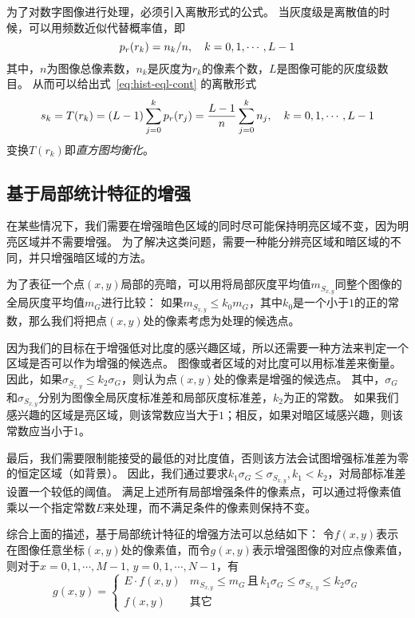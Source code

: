 \documentclass{hitgsrep}
\begin{document}
为了对数字图像进行处理，必须引入离散形式的公式。
当灰度级是离散值的时候，可以用频数近似代替概率值，即
\begin{equation}
    p_r\qty(r_k)=n_k/n\qc{k=0,1,\cdots,L-1}
\end{equation}
其中，$n$为图像总像素数，$n_k$是灰度为$r_k$的像素个数，$L$是图像可能的灰度级数目。
从而可以给出式~\eqref{eq:hist-eql-cont} 的离散形式
\begin{equation}
    s_k=T\qty(r_k)=(L-1)\sum_{j=0}^k p_r(r_j)=\frac{L-1}{n}\sum_{j=0}^k n_j\qc{k=0,1,\cdots,L-1}
\end{equation}
变换$T(r_k)$即\emph{直方图均衡化}。

\subsection{基于局部统计特征的增强}

在某些情况下，我们需要在增强暗色区域的同时尽可能保持明亮区域不变，因为明亮区域并不需要增强。
为了解决这类问题，需要一种能分辨亮区域和暗区域的不同，并只增强暗区域的方法。

为了表征一个点$(x,y)$局部的亮暗，可以用将局部灰度平均值$m_{S_{x,y}}$同整个图像的全局灰度平均值$m_G$进行比较：
如果$m_{S_{x,y}}\le k_0m_G$，其中$k_0$是一个小于$1$的正的常数，那么我们将把点$(x,y)$处的像素考虑为处理的候选点。

因为我们的目标在于增强低对比度的感兴趣区域，所以还需要一种方法来判定一个区域是否可以作为增强的候选点。
图像或者区域的对比度可以用标准差来衡量。
因此，如果$\sigma_{S_{x,y}}\le k_2\sigma_G$，则认为点$(x,y)$处的像素是增强的候选点。
其中，$\sigma_G$和$\sigma_{S_{x,y}}$分别为图像全局灰度标准差和局部灰度标准差，$k_2$为正的常数。
如果我们感兴趣的区域是亮区域，则该常数应当大于$1$；相反，如果对暗区域感兴趣，则该常数应当小于$1$。

最后，我们需要限制能接受的最低的对比度值，否则该方法会试图增强标准差为零的恒定区域（如背景）。
因此，我们通过要求$k_1\sigma_G\le\sigma_{S_{x,y}}, k_1<k_2$，对局部标准差设置一个较低的阈值。
满足上述所有局部增强条件的像素点，可以通过将像素值乘以一个指定常数$E$来处理，而不满足条件的像素则保持不变。

综合上面的描述，基于局部统计特征的增强方法可以总结如下：
令$f(x,y)$表示在图像任意坐标$(x,y)$处的像素值，而令$g(x,y)$表示增强图像的对应点像素值，
则对于$x=0,1,\cdots,M-1,\,y=0,1,\cdots,N-1$，有
\begin{equation}\label{eq:local-enh}
    g(x,y)=\begin{cases}
        E\cdot f(x,y) & m_{S_{x,y}}\le m_G\,\text{且}\,k_1\sigma_G\le\sigma_{S_{x,y}}\le k_2\sigma_G\\
        f(x,y) & \text{其它}
    \end{cases}
\end{equation}
\end{document}
